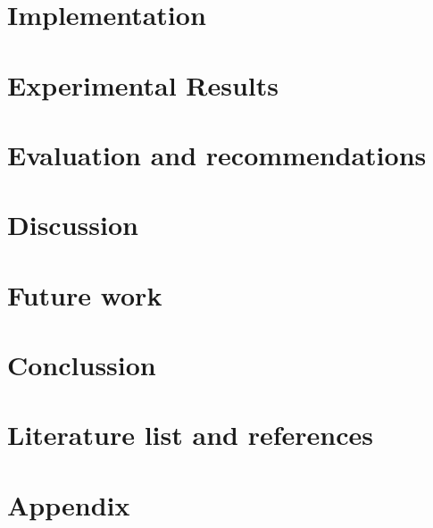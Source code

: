 \documentclass[12pt]{article} %
\begin{document}
\section{Implementation}

\section{Experimental Results}

\section{Evaluation and recommendations}

\section{Discussion}

\section{Future work}

\section{Conclussion}
\section{Literature list and references}
\section{Appendix}




\newpage
\appendix
\label{appendix}
\end{document}
